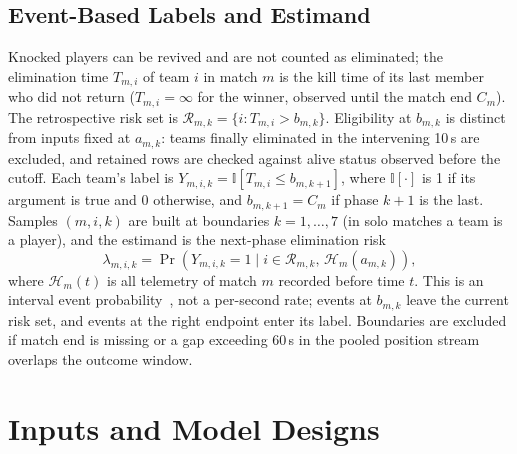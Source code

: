 \documentclass[sigconf,anonymous,nonacm]{acmart}
\begin{document}
\subsection{Event-Based Labels and Estimand}
Knocked players can be revived and are not counted as eliminated; the elimination time $T_{m,i}$ of team $i$ in match $m$ is the kill time of its last member who did not return ($T_{m,i}=\infty$ for the winner, observed until the match end $C_m$).
The retrospective risk set is $\mathcal{R}_{m,k}=\{i:T_{m,i}>b_{m,k}\}$. Eligibility at $b_{m,k}$ is distinct from inputs fixed at $a_{m,k}$: teams finally eliminated in the intervening 10\,s are excluded, and retained rows are checked against alive status observed before the cutoff.
Each team's label is $Y_{m,i,k}=\mathbb{I}[T_{m,i}\le b_{m,k+1}]$, where $\mathbb{I}[\cdot]$ is 1 if its argument is true and 0 otherwise, and $b_{m,k+1}=C_m$ if phase $k+1$ is the last.
Samples $(m,i,k)$ are built at boundaries $k=1,\dots,7$ (in solo matches a team is a player), and the estimand is the next-phase elimination risk
\begin{equation}
\lambda_{m,i,k}=\Pr\!\left(Y_{m,i,k}=1 \mid i\in\mathcal{R}_{m,k},\,\mathcal{H}_{m}(a_{m,k})\right),
\label{eq:hazard}
\end{equation}
where $\mathcal{H}_{m}(t)$ is all telemetry of match $m$ recorded before time $t$.
This is an interval event probability~\cite{vanHouwelingen07}, not a per-second rate; events at $b_{m,k}$ leave the current risk set, and events at the right endpoint enter its label. Boundaries are excluded if match end is missing or a gap exceeding 60\,s in the pooled position stream overlaps the outcome window.

\section{Inputs and Model Designs}
\label{sec:method:design}
\end{document}
